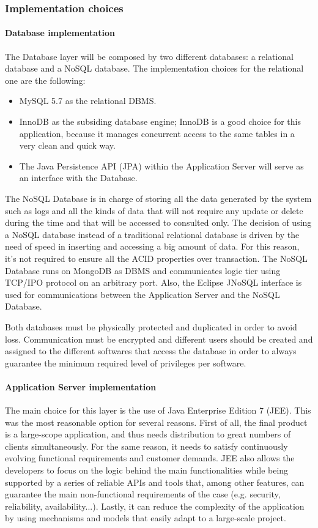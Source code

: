 \subsubsection{Implementation choices}
\paragraph{Database implementation}
The Database layer will be composed by two different databases: a relational database and a NoSQL database. The implementation choices for the relational one are the following:

\begin{itemize}
\item MySQL 5.7 as the relational DBMS.
\item InnoDB as the subsiding database engine; InnoDB is a good choice for this application, because it manages concurrent access to the same tables in a very clean and quick way.
\item The Java Persistence API (JPA) within the Application Server will serve as an interface with the Database.
\end{itemize}

The NoSQL Database is in charge of storing all the data generated by the system such as logs and all the kinds of data that  will not require any update or delete during the time and that will be accessed to consulted only. The decision of using a NoSQL database instead of a traditional relational database is driven by the need of speed in inserting and accessing a big amount of data. For this reason, it's not required to ensure all the ACID properties over transaction. The NoSQL Database runs on MongoDB as DBMS and communicates logic tier using TCP/IPO protocol on an arbitrary port. Also, the Eclipse JNoSQL interface is used for communications between the Application Server and the NoSQL Database.

Both databases must be physically protected and duplicated in order to avoid loss. Communication must be encrypted and different users should be created and assigned to the different softwares that access the database in order to always guarantee the minimum required level of privileges per software.

\paragraph{Application Server implementation}
The main choice for this layer is the use of Java Enterprise Edition 7 (JEE). This was the most reasonable option for several reasons. First of all, the final product is a large-scope application, and thus needs distribution to great numbers of clients simultaneously. For the same reason, it needs to satisfy continuously evolving functional requirements and customer demands. JEE also allows the developers to focus on the logic behind the main functionalities while being supported by a series of reliable APIs and tools that, among other features, can guarantee the main non-functional requirements of the case (e.g. security, reliability, availability...). Lastly, it can reduce the complexity of the application by using mechanisms and models that easily adapt to a large-scale project. 

